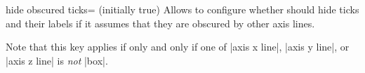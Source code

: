 \begin{pgfplotsxykey}{hide obscured \x\space ticks= (initially true)}
    Allows to configure whether \PGFPlots{} should hide ticks and their labels
    if it assumes that they are obscured by other axis lines.
\begin{codeexample}[]
\end{codeexample}
\begin{codeexample}[]
\end{codeexample}
    Note that this key applies if only and only if one of |axis x line|,
    |axis y line|, or |axis z line| is \emph{not} |box|.
\end{pgfplotsxykey}
